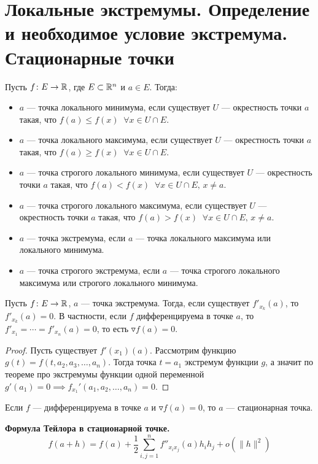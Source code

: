 \section{Локальные экстремумы. Определение и необходимое условие экстремума. Стационарные точки}
\begin{conj}
Пусть $f\colon E \to \mathbb{R}$, где $E \subset \mathbb{R}^n$ и $a \in E$. Тогда:
\begin{itemize}
    \item $a$ --- точка локального минимума, если существует $U$ --- окрестность точки $a$ такая, что $f(a) \leqslant f(x) \;\; \forall x \in U \cap E$.
    \item $a$ --- точка локального максимума, если существует $U$ --- окрестность точки $a$ такая, что $f(a) \geqslant f(x) \;\; \forall x \in U \cap E$.
    \item $a$ --- точка строгого локального минимума, если существует $U$ --- окрестность точки $a$ такая, что $f(a) < f(x) \;\; \forall x \in U \cap E,\, x \neq a$.
    \item $a$ --- точка строгого локального максимума, если существует $U$ --- окрестность точки $a$ такая, что $f(a) > f(x) \;\; \forall x \in U \cap E,\, x \neq a$.
    \item $a$ --- точка экстремума, если $a$ --- точка локального максимума или локального минимума.
    \item $a$ --- точка строгого экстремума, если $a$ --- точка строгого локального максимума или строгого локального минимума.
\end{itemize}
\end{conj}

\begin{theorem}
Пусть $f\colon E \to \mathbb{R}$, $a$ --- точка экстремума. Тогда, если существует $f'_{x_k}(a)$, то $f'_{x_k}(a) = 0$. В частности, если $f$ дифференцируема в точке $a$, то $f'_{x_1} = \dotsb = f'_{x_n}(a) = 0$, то есть $\triangledown f(a) = 0$.
\end{theorem}
\begin{proof}
Пусть существует $f'(x_1)(a)$. Рассмотрим функцию $g(t) = f(t, a_2, a_3, \dotsc, a_n)$. Тогда точка $t = a_1$ экстремум функции $g$, а значит по теореме про экстремумы функции одной переменной $g'(a_1) = 0 \implies f_{x_1}'(a_1, a_2, \dotsc, a_n) = 0$.
\end{proof}

\begin{conj}
Если $f$ --- дифференцируема в точке $a$ и $\triangledown f(a) = 0$, то $a$ --- стационарная точка.
\end{conj}

\textbf{Формула Тейлора в стационарной точке.}
\begin{equation*}
f(a + h) = f(a) + \frac{1}{2} \sum\limits_{i, j = 1}^{n} f''_{x_i x_j}(a) h_i h_j + o(\| h \|^2)
\end{equation*}